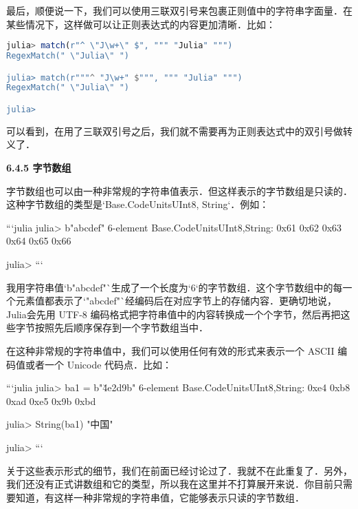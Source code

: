 最后，顺便说一下，我们可以使用三联双引号来包裹正则值中的字符串字面量．在某些情况下，这样做可以让正则表达式的内容更加清晰．比如：
\begin{lstlisting}[language=julia]
julia> match(r"^ \"J\w+\" $", """ "Julia" """)
RegexMatch(" \"Julia\" ")

julia> match(r"""^ "J\w+" $""", """ "Julia" """)
RegexMatch(" \"Julia\" ")

julia> 
\end{lstlisting}

可以看到，在用了三联双引号之后，我们就不需要再为正则表达式中的双引号做转义了．

\textbf{6.4.5 字节数组}

字节数组也可以由一种非常规的字符串值表示．但这样表示的字节数组是只读的．这种字节数组的类型是`Base.CodeUnits{UInt8, String}`．例如：

```julia
julia> b"abcdef"
6-element Base.CodeUnits{UInt8,String}:
 0x61
 0x62
 0x63
 0x64
 0x65
 0x66

julia>
```

我用字符串值`b"abcdef"`生成了一个长度为`6`的字节数组．这个字节数组中的每一个元素值都表示了`"abcdef"`经编码后在对应字节上的存储内容．更确切地说，Julia会先用 UTF-8 编码格式把字符串值中的内容转换成一个个字节，然后再把这些字节按照先后顺序保存到一个字节数组当中．

在这种非常规的字符串值中，我们可以使用任何有效的形式来表示一个 ASCII 编码值或者一个 Unicode 代码点．比如：

```julia
julia> ba1 = b"\u4e2d\x9b\xbd"
6-element Base.CodeUnits{UInt8,String}:
 0xe4
 0xb8
 0xad
 0xe5
 0x9b
 0xbd

julia> String(ba1)
"中国"

julia>
```

关于这些表示形式的细节，我们在前面已经讨论过了．我就不在此重复了．另外，我们还没有正式讲数组和它的类型，所以我在这里并不打算展开来说．你目前只需要知道，有这样一种非常规的字符串值，它能够表示只读的字节数组．